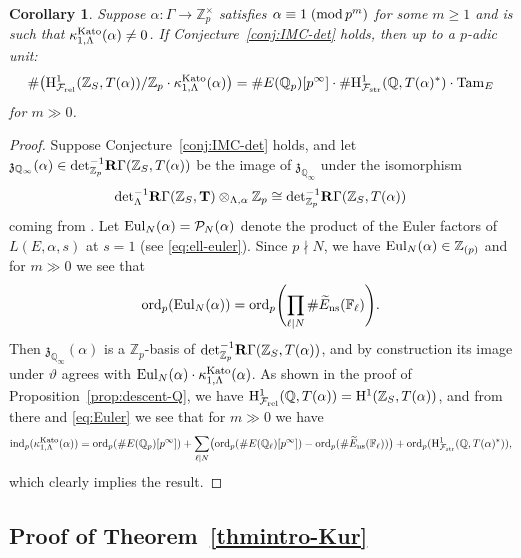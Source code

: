 \documentclass[10pt,reqno]{amsart}
\numberwithin{equation}{section}
\theoremstyle{plain}
\theoremstyle{definition}
\theoremstyle{definition}
\theoremstyle{plain}
\theoremstyle{plain}
\theoremstyle{plain}
\newtheorem{cor}[thm]{Corollary}
\theoremstyle{plain}
\theoremstyle{plain}
\theoremstyle{plain}
\newcommand{\Tc}{\mathbf{T}}
\newcommand{\Z}{\mathbb{Z}}
\newcommand{\Q}{\mathbb{Q}}
\newcommand{\Fcal}{\mathcal{F}}
\newcommand{\rH}{\mathrm{H}}
\begin{document}
\begin{cor}\label{cor:index-m-Q}
Suppose $\alpha:\Gamma\rightarrow\Z_p^\times$ satisfies $\alpha\equiv 1\;({\rm mod}\,p^m)$ for some $m\geq 1$ and is such that $\kappa_{1,\Lambda}^{\rm Kato}(\alpha)\neq 0$. If Conjecture~\ref{conj:IMC-det} holds, then up to a $p$-adic unit: 
\[
\#\bigl(\rH^1_{\Fcal_{\rm rel}}(\Z_S,T(\alpha))/\Z_p\cdot\kappa_{1,\Lambda}^{\rm Kato}(\alpha)\bigr)=\#E(\Q_p)[p^\infty]\cdot\# \rH^1_{\Fcal_{\rm str}}(\Q,T(\alpha)^*)\cdot{\rm Tam}_E
\]
for $m\gg 0$.
\end{cor}

\begin{proof}
Suppose Conjecture~\ref{conj:IMC-det} holds, and let $\mathfrak{z}_{\Q_\infty}(\alpha)\in{\rm det}_{\Z_p}^{-1}\mathbf{R}\Gamma(\Z_S,T(\alpha))$ be the image of $\mathfrak{z}_{\Q_\infty}$ under the isomorphism
\begin{equation}\label{eq:perfect-control-kato}
{\rm det}_\Lambda^{-1}\mathbf{R}\Gamma(\Z_S,\Tc)\otimes_{\Lambda,\alpha}\Z_p\cong{\rm det}_{\Z_p}^{-1}\mathbf{R}\Gamma(\Z_S,T(\alpha))
\end{equation}
coming from \cite[Prop.~1.6.5(3)]{fukaya-kato-AMS}. Let ${\rm Eul}_N(\alpha)=\mathcal{P}_N(\alpha)$ denote the product of the Euler factors of $L(E,\alpha,s)$ at $s=1$ (see \eqref{eq:ell-euler}). Since $p\nmid N$, we have ${\rm Eul}_N(\alpha)\in\Z_{(p)}$ and for $m\gg 0$ we see that 
\begin{equation}\label{eq:Euler}
{\rm ord}_p({\rm Eul}_N(\alpha))={\rm ord}_p\Biggl(\prod_{\ell\mid N}\#\widetilde{E}_{\rm ns}(\mathbb{F}_\ell)\Biggr).
\end{equation}
Then $\mathfrak{z}_{\Q_\infty}(\alpha)$ is a $\Z_p$-basis of ${\rm det}_{\Z_p}^{-1}\mathbf{R}\Gamma(\Z_S,T(\alpha))$, and by construction its image under $\vartheta$ agrees with ${\rm Eul}_N(\alpha)\cdot\kappa_{1,\Lambda}^{\rm Kato}(\alpha)$. 
As shown in the proof of Proposition~\ref{prop:descent-Q}, we have $\rH^1_{\Fcal_{\rm rel}}(\Q,T(\alpha))=\rH^1(\Z_S,T(\alpha))$, and from there and \eqref{eq:Euler} we see that for $m\gg 0$ we have
\[
{\rm ind}_p(\kappa_{1,\Lambda}^{\rm Kato}(\alpha))={\rm ord}_p(\#E(\Q_p)[p^\infty])+\sum_{\ell\mid N}\bigl({\rm ord}_p(\#E(\Q_\ell)[p^\infty])-{\rm ord}_p(\#\widetilde{E}_{\rm ns}(\mathbb{F}_\ell))\bigr)+
{\rm ord}_p(\rH^1_{\Fcal_{\rm str}}(\Q,T(\alpha)^*)),
\]
which clearly implies the result.
\end{proof}


\subsection{Proof of Theorem~\ref{thmintro-Kur}}
\end{document}
